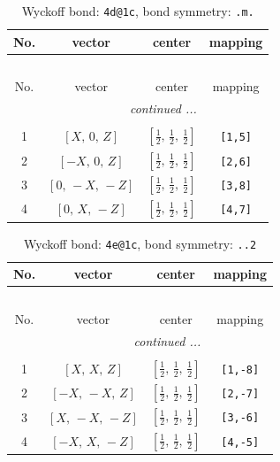 \documentclass[fleqn,8pt]{jsarticle}
\begin{document}
\begin{longtable}{cccc}
\caption{Wyckoff bond: {\tt 4d@1c}, bond symmetry: {\tt .m.}}
 \\
 \hline \hline
No. & vector & center & mapping \\ \hline \endfirsthead

\multicolumn{3}{l}{\tablename\ \thetable{}} \\
 \hline \hline
No. & vector & center & mapping \\ \hline \endhead

 \hline \hline
\multicolumn{3}{r}{\footnotesize\it continued ...} \\ \endfoot

 \hline \hline
\multicolumn{3}{r}{} \\ \endlastfoot

1 & $\left[ X,\, 0,\, Z \right]$ & $\left[ \frac{1}{2},\, \frac{1}{2},\, \frac{1}{2} \right]$ & {\tt [1,5]} \\ \hline
2 & $\left[ - X,\, 0,\, Z \right]$ & $\left[ \frac{1}{2},\, \frac{1}{2},\, \frac{1}{2} \right]$ & {\tt [2,6]} \\ \hline
3 & $\left[ 0,\, - X,\, - Z \right]$ & $\left[ \frac{1}{2},\, \frac{1}{2},\, \frac{1}{2} \right]$ & {\tt [3,8]} \\ \hline
4 & $\left[ 0,\, X,\, - Z \right]$ & $\left[ \frac{1}{2},\, \frac{1}{2},\, \frac{1}{2} \right]$ & {\tt [4,7]} \\
\end{longtable}
\renewcommand{\arraystretch}{1.2}
\begin{longtable}{cccc}
\caption{Wyckoff bond: {\tt 4e@1c}, bond symmetry: {\tt ..2}}
 \\
 \hline \hline
No. & vector & center & mapping \\ \hline \endfirsthead

\multicolumn{3}{l}{\tablename\ \thetable{}} \\
 \hline \hline
No. & vector & center & mapping \\ \hline \endhead

 \hline \hline
\multicolumn{3}{r}{\footnotesize\it continued ...} \\ \endfoot

 \hline \hline
\multicolumn{3}{r}{} \\ \endlastfoot

1 & $\left[ X,\, X,\, Z \right]$ & $\left[ \frac{1}{2},\, \frac{1}{2},\, \frac{1}{2} \right]$ & {\tt [1,-8]} \\ \hline
2 & $\left[ - X,\, - X,\, Z \right]$ & $\left[ \frac{1}{2},\, \frac{1}{2},\, \frac{1}{2} \right]$ & {\tt [2,-7]} \\ \hline
3 & $\left[ X,\, - X,\, - Z \right]$ & $\left[ \frac{1}{2},\, \frac{1}{2},\, \frac{1}{2} \right]$ & {\tt [3,-6]} \\ \hline
4 & $\left[ - X,\, X,\, - Z \right]$ & $\left[ \frac{1}{2},\, \frac{1}{2},\, \frac{1}{2} \right]$ & {\tt [4,-5]} \\
\end{longtable}
\end{document}
